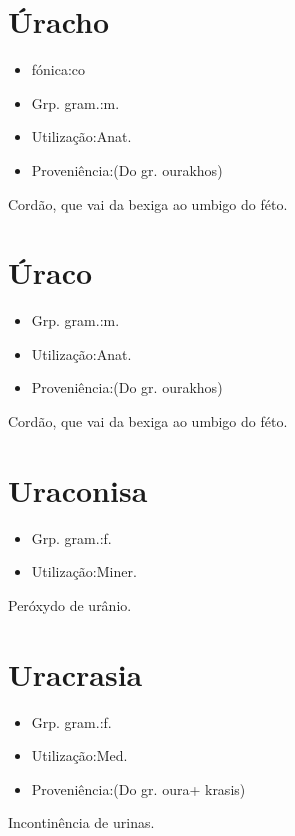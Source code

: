 \documentclass{article}
\begin{document}
\section{Úracho}
\begin{itemize}
\item {fónica:co}
\end{itemize}
\begin{itemize}
\item {Grp. gram.:m.}
\end{itemize}
\begin{itemize}
\item {Utilização:Anat.}
\end{itemize}
\begin{itemize}
\item {Proveniência:(Do gr. \textunderscore ourakhos\textunderscore )}
\end{itemize}
Cordão, que vai da bexiga ao umbigo do féto.
\section{Úraco}
\begin{itemize}
\item {Grp. gram.:m.}
\end{itemize}
\begin{itemize}
\item {Utilização:Anat.}
\end{itemize}
\begin{itemize}
\item {Proveniência:(Do gr. \textunderscore ourakhos\textunderscore )}
\end{itemize}
Cordão, que vai da bexiga ao umbigo do féto.
\section{Uraconisa}
\begin{itemize}
\item {Grp. gram.:f.}
\end{itemize}
\begin{itemize}
\item {Utilização:Miner.}
\end{itemize}
Peróxydo de urânio.
\section{Uracrasia}
\begin{itemize}
\item {Grp. gram.:f.}
\end{itemize}
\begin{itemize}
\item {Utilização:Med.}
\end{itemize}
\begin{itemize}
\item {Proveniência:(Do gr. \textunderscore oura\textunderscore  + \textunderscore krasis\textunderscore )}
\end{itemize}
Incontinência de urinas.
\end{document}

